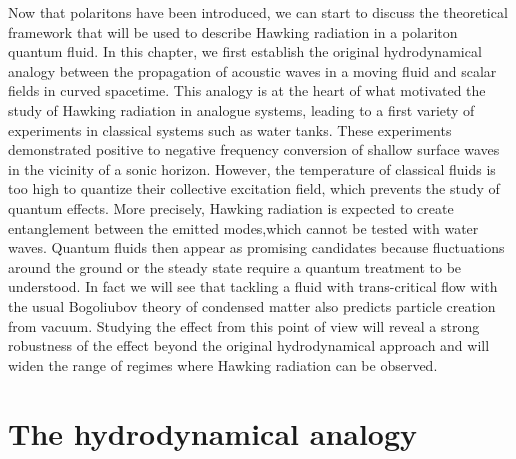 Now that polaritons have been introduced, we can start to discuss the theoretical framework that will be used to 
describe Hawking radiation in a polariton quantum fluid. In this chapter, we first establish the original hydrodynamical analogy between the propagation of acoustic waves in a moving fluid and scalar fields in curved spacetime. This analogy is at the heart of what motivated the study of Hawking radiation in analogue systems, leading to a first variety of experiments in classical systems such as water tanks. These experiments~\cite{rousseaux_observation_2008,weinfurtner_measurement_2011} demonstrated positive to negative frequency conversion of shallow surface waves in the vicinity of a sonic horizon. However, the temperature
of classical fluids is too high to quantize their collective excitation field, which prevents the study of quantum effects. More precisely, Hawking radiation is expected to create entanglement between the emitted modes,which cannot be tested with water waves. Quantum fluids then appear as promising candidates because fluctuations around the ground or the steady state require a quantum treatment to be understood. In fact we will see that tackling a fluid with trans-critical flow with the usual Bogoliubov theory of condensed matter also predicts particle creation from vacuum. Studying the effect from this point of view will reveal a strong robustness of the effect beyond the original hydrodynamical approach and will widen the range of regimes where Hawking radiation can be observed.


\section{The hydrodynamical analogy}

